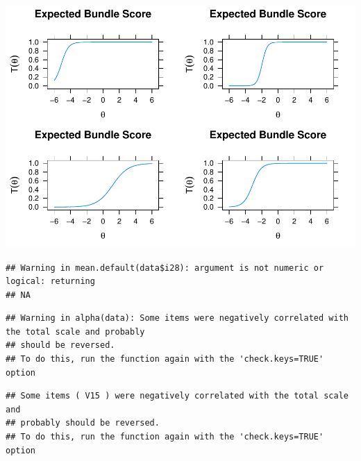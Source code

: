 \documentclass[
  english,
  man,floatsintext]{apa6}
\begin{document}
\includegraphics{papaja-test_files/figure-latex/unnamed-chunk-5-3.pdf}

\begin{verbatim}
## Warning in mean.default(data$i28): argument is not numeric or logical: returning
## NA
\end{verbatim}

\begin{verbatim}
## Warning in alpha(data): Some items were negatively correlated with the total scale and probably 
## should be reversed.  
## To do this, run the function again with the 'check.keys=TRUE' option
\end{verbatim}

\begin{verbatim}
## Some items ( V15 ) were negatively correlated with the total scale and 
## probably should be reversed.  
## To do this, run the function again with the 'check.keys=TRUE' option
\end{verbatim}
\end{document}
